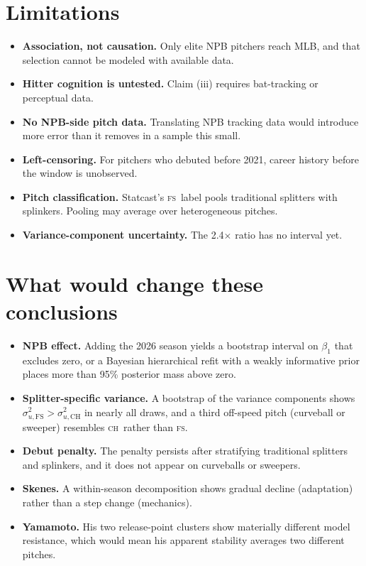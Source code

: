 \documentclass[11pt]{article}
\newcommand{\FS}{\textsc{fs}}
\newcommand{\CH}{\textsc{ch}}
\begin{document}
\section{Limitations}

\begin{itemize}
\item \textbf{Association, not causation.} Only elite NPB pitchers reach MLB, and that selection cannot be modeled with available data.
\item \textbf{Hitter cognition is untested.} Claim (iii) requires bat-tracking or perceptual data.
\item \textbf{No NPB-side pitch data.} Translating NPB tracking data would introduce more error than it removes in a sample this small.
\item \textbf{Left-censoring.} For pitchers who debuted before 2021, career history before the window is unobserved.
\item \textbf{Pitch classification.} Statcast's \FS\ label pools traditional splitters with splinkers. Pooling may average over heterogeneous pitches.
\item \textbf{Variance-component uncertainty.} The 2.4$\times$ ratio has no interval yet.
\end{itemize}

\section{What would change these conclusions}

\begin{itemize}
\item \textbf{NPB effect.} Adding the 2026 season yields a bootstrap interval on $\beta_1$ that excludes zero, or a Bayesian hierarchical refit with a weakly informative prior places more than 95\% posterior mass above zero.
\item \textbf{Splitter-specific variance.} A bootstrap of the variance components shows $\sigma_{u,\text{FS}}^2 > \sigma_{u,\text{CH}}^2$ in nearly all draws, and a third off-speed pitch (curveball or sweeper) resembles \CH\ rather than \FS.
\item \textbf{Debut penalty.} The penalty persists after stratifying traditional splitters and splinkers, and it does not appear on curveballs or sweepers.
\item \textbf{Skenes.} A within-season decomposition shows gradual decline (adaptation) rather than a step change (mechanics).
\item \textbf{Yamamoto.} His two release-point clusters show materially different model resistance, which would mean his apparent stability averages two different pitches.
\end{itemize}
\end{document}
